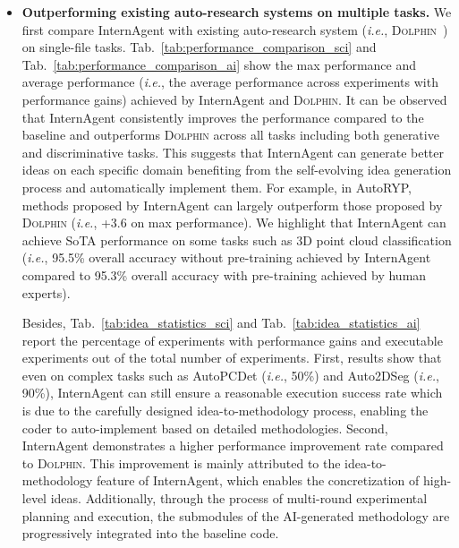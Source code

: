 \begin{itemize}
    \item \textbf{Outperforming existing auto-research systems on multiple tasks.} We first compare InternAgent with existing auto-research system (\textit{i.e.}, \textsc{Dolphin}~\citep{yuan2025dolphin}) on single-file tasks. Tab.~\ref{tab:performance_comparison_sci} and Tab.~\ref{tab:performance_comparison_ai} show the max performance and average performance (\textit{i.e.}, the average performance across experiments with performance gains) achieved by InternAgent and \textsc{Dolphin}.  It can be observed that InternAgent consistently improves the performance compared to the baseline and outperforms \textsc{Dolphin} across all tasks including both generative and discriminative tasks. This suggests that  InternAgent can generate better ideas on each specific domain benefiting from the self-evolving idea generation process and automatically implement them. For example, in AutoRYP, methods proposed by InternAgent can largely outperform those proposed by \textsc{Dolphin} (\textit{i.e.}, +3.6 on max performance). We highlight that InternAgent can achieve SoTA performance on some tasks such as 3D point cloud classification (\textit{i.e.}, 95.5\% overall accuracy without pre-training achieved by InternAgent compared to 95.3\% overall accuracy with pre-training achieved by human experts).

    Besides, Tab.~\ref{tab:idea_statistics_sci} and Tab.~\ref{tab:idea_statistics_ai} report the percentage of experiments with performance gains and executable experiments out of the total number of experiments. First, results show that even on complex tasks such as AutoPCDet (\textit{i.e.}, 50\%) and Auto2DSeg (\textit{i.e.}, 90\%), InternAgent can still ensure a reasonable execution success rate which is due to the carefully designed idea-to-methodology process, enabling the coder to auto-implement based on detailed methodologies. Second, InternAgent demonstrates a higher performance improvement rate compared to \textsc{Dolphin}. This improvement is mainly attributed to the idea-to-methodology feature of InternAgent, which enables the concretization of high-level ideas. Additionally, through the process of multi-round experimental planning and execution, the submodules of the AI-generated methodology are progressively integrated into the baseline code.
    

\end{itemize}
